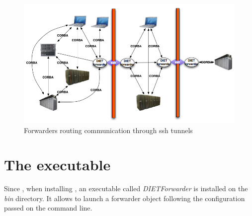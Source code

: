 \begin{figure}[htp]
\begin{center}
  \includegraphics[width=12cm]{fig/Forwarder}
\end{center}
\caption{Forwarders routing \diet communication through ssh tunnels
  \label{fig:forwarder}}
\end{figure}

\section{The \dietforwarder executable}
\label{sec:ForwarderConfig}
Since , when installing \diet, an executable called \textit{DIETForwarder}
is installed on the \textit{bin} directory. It allows to launch a
forwarder object following the configuration passed on the command
line.
